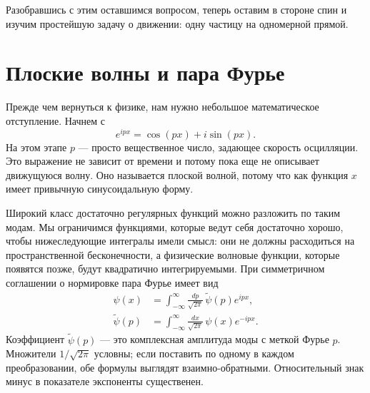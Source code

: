 \begin{classroomqa}
\end{classroomqa}

Разобравшись с этим оставшимся вопросом, теперь оставим в стороне спин и изучим простейшую задачу о движении: одну частицу на одномерной прямой.

\section{Плоские волны и пара Фурье}

Прежде чем вернуться к физике, нам нужно небольшое математическое отступление. Начнем с
\begin{equation}
e^{ipx}=\cos(px)+i\sin(px).
\end{equation}
На этом этапе \(p\) — просто вещественное число, задающее скорость осцилляции. Это выражение не зависит от времени и потому пока еще не описывает движущуюся волну. Оно называется плоской волной, потому что как функция \(x\) имеет привычную синусоидальную форму.

Широкий класс достаточно регулярных функций можно разложить по таким модам. Мы ограничимся функциями, которые ведут себя достаточно хорошо, чтобы нижеследующие интегралы имели смысл: они не должны расходиться на пространственной бесконечности, а физические волновые функции, которые появятся позже, будут квадратично интегрируемыми. При симметричном соглашении о нормировке пара Фурье имеет вид
\begin{align}
\psi(x)
&=
\int_{-\infty}^{\infty}
\frac{dp}{\sqrt{2\pi}}\,
\widetilde{\psi}(p)e^{ipx},
\label{eq:l9-fourier-forward}\\
\widetilde{\psi}(p)
&=
\int_{-\infty}^{\infty}
\frac{dx}{\sqrt{2\pi}}\,
\psi(x)e^{-ipx}.
\label{eq:l9-fourier-inverse}
\end{align}
Коэффициент \(\widetilde{\psi}(p)\) — это комплексная амплитуда моды с меткой Фурье \(p\). Множители \(1/\sqrt{2\pi}\) условны; если поставить по одному в каждом преобразовании, обе формулы выглядят взаимно-обратными. Относительный знак минус в показателе экспоненты существенен.

